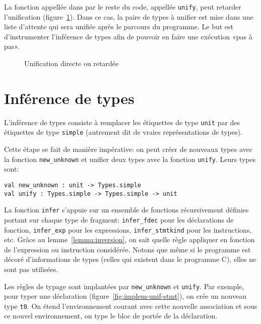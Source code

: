 La fonction appellée dans par le reste du code, appellée \texttt{unify}, peut
retarder l'unification (figure~\ref{fig:implem-lazy}). Dans ce cas, la paire de
types à unifier est mise dans une liste d'attente qui sera unifiée après le
parcours du programme. Le but est d'instrumenter l'inférence de types afin de
pouvoir en faire une exécution «pas à pas».

\begin{figure}


\caption{Unification directe ou retardée}
\label{fig:implem-lazy}
\end{figure}

\section{Inférence de types}

L'inférence de types consiste à remplacer les étiquettes de type \texttt{unit}
par des étiquettes de type \texttt{simple} (autrement dit de vraies
représentations de types).

Cette étape se fait de manière impérative: on peut créer de nouveaux types avec
la fonction \texttt{new\_unknown} et unifier deux types avec la fonction
\texttt{unify}. Leurs types sont:

\begin{verbatim}
val new_unknown : unit -> Types.simple
val unify : Types.simple -> Types.simple -> unit
\end{verbatim}

La fonction \texttt{infer} s'appuie sur un ensemble de fonctions récursivement
définies portant sur chaque type de fragment: \texttt{infer\_fdec} pour les
déclarations de fonction, \texttt{infer\_exp} pour les expressions,
\texttt{infer\_stmtkind} pour les instructions, etc. Grâce au
lemme~\ref{lemma:inversion}, on sait quelle règle appliquer en fonction de
l'expression ou instruction considérée. Notons que même si le programme
\newspeak est décoré d'informations de types (celles qui existent dans le
programme C), elles ne sont pas utilisées.

Les règles de typage sont implantées par \texttt{new\_unknown} et
\texttt{unify}. Par exemple, pour typer une déclaration
(figure~\ref{fig:implem-unif-stmt}), on crée un nouveau type \texttt{t0}. On
étend l'environnement courant avec cette nouvelle association et sous ce nouvel
environnement, on type le bloc de portée de la déclaration.

